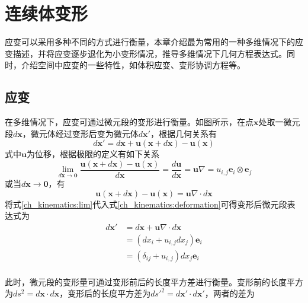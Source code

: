 \chapter{连续体变形}
应变可以采用多种不同的方式进行衡量，本章介绍最为常用的一种多维情况下的应变描述，并将应变逐步退化为小变形情况，推导多维情况下几何方程表达式。同时，介绍空间中应变的一些特性，如体积应变、变形协调方程等。
\section{应变}
在多维情况下，应变可通过微元段的变形进行衡量。如图所示，在点$\boldsymbol x$处取一微元段$d\boldsymbol x$，微元体经过变形后变为微元体$d\boldsymbol x'$，根据几何关系有
\begin{equation}\label{ch_kinematics:deformation}
d\boldsymbol x' = d\boldsymbol x + \boldsymbol u(\boldsymbol x + d\boldsymbol x) - \boldsymbol u(\boldsymbol x)
\end{equation}
式中$\boldsymbol u$为位移，根据极限的定义有如下关系
\begin{equation}
\lim_{d\boldsymbol x\rightarrow \boldsymbol 0} \frac{\boldsymbol u(\boldsymbol x + d\boldsymbol x)-\boldsymbol u(\boldsymbol x)}{d\boldsymbol x} = \frac{d\boldsymbol u}{d\boldsymbol x} = \boldsymbol u \nabla = u_{i,j} \boldsymbol e_i \otimes \boldsymbol e_j
\end{equation}
或当$d\boldsymbol x\rightarrow \boldsymbol 0$，有
\begin{equation}\label{ch_kinematics:lim}
\boldsymbol u(\boldsymbol x + d\boldsymbol x) - \boldsymbol u(\boldsymbol x) = \boldsymbol u \nabla \cdot d\boldsymbol x
\end{equation}
将式\eqref{ch_kinematics:lim}代入式\eqref{ch_kinematics:deformation}可得变形后微元段表达式为
\begin{equation}\label{ch_kinematics:kin}
    \begin{split}
        d\boldsymbol x' &= d\boldsymbol x + \boldsymbol u \nabla \cdot d\boldsymbol x \\
                        &= (dx_i + u_{i,j} dx_j) \boldsymbol e_i \\
                        &= (\delta_{ij} + u_{i,j})dx_j \boldsymbol e_i \\
    \end{split}
\end{equation}\par
此时，微元段的变形量可通过变形前后的长度平方差进行衡量。变形前的长度平方为$ds^2=d\boldsymbol x \cdot d\boldsymbol x$，变形后的长度平方差为$ds'^2=d\boldsymbol x' \cdot d\boldsymbol x'$，两者的差为
